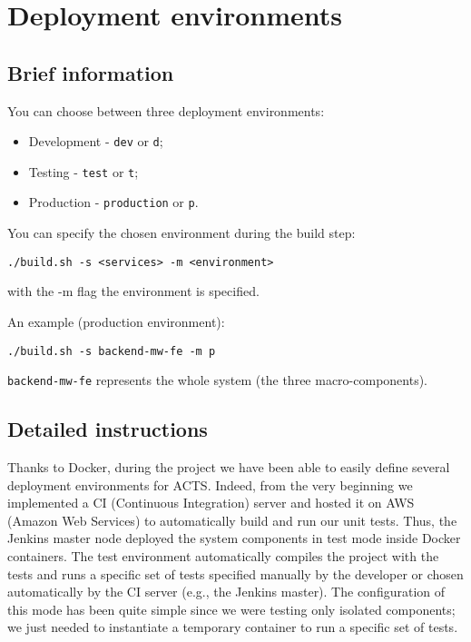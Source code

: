 
\section{Deployment environments}

\subsection{Brief information}

You can choose between three deployment environments:

\begin{itemize}
\item Development - \texttt{dev} or \texttt{d};
\item Testing - \texttt{test} or \texttt{t};
\item Production - \texttt{production} or \texttt{p}.
\end{itemize}

You can specify the chosen environment during the build step:

\begin{lstlisting}
./build.sh -s <services> -m <environment>
\end{lstlisting}

with the -m flag the environment is specified.


An example (production environment):

\begin{lstlisting}
./build.sh -s backend-mw-fe -m p
\end{lstlisting}

\texttt{backend-mw-fe} represents the whole system (the three macro-components).


\subsection{Detailed instructions}
Thanks to Docker, during the project we have been able to easily define several
deployment environments for ACTS. Indeed, from the very beginning we implemented a CI (Continuous Integration) server and hosted it
on AWS (Amazon Web Services) to automatically build and run our unit tests.
Thus, the Jenkins master node deployed the
system components in test mode inside Docker containers.
The test environment automatically compiles the project with the tests and
runs a specific set of tests specified manually by the developer or chosen automatically by
the CI server (e.g., the Jenkins master). The configuration of this mode has been quite simple
since we were testing only isolated components;
we just needed to instantiate a temporary
container to run a specific set of tests.


